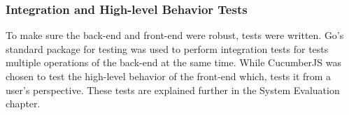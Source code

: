 \subsubsection{Integration and High-level Behavior Tests}
To make sure the back-end and front-end were robust, tests were written. Go's standard package for testing was used to perform integration tests for tests multiple operations of the back-end at the same time. While CucumberJS was chosen to test the high-level behavior of the front-end which, tests it from a user's perspective. These tests are explained further in the System Evaluation chapter.

